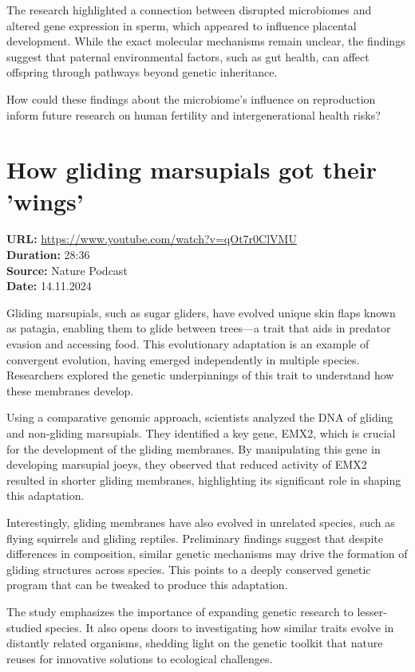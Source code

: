 \documentclass[12pt]{article}
\begin{document}
The research highlighted a connection between disrupted microbiomes and altered gene expression in sperm, which appeared to influence placental development. While the exact molecular mechanisms remain unclear, the findings suggest that paternal environmental factors, such as gut health, can affect offspring through pathways beyond genetic inheritance.  

\medskip
How could these findings about the microbiome’s influence on reproduction inform future research on human fertility and intergenerational health risks?





\newpage

\section{How gliding marsupials got their 'wings'}
\textbf{URL:} \url{https://www.youtube.com/watch?v=qOt7r0ClVMU}\\
\textbf{Duration:} 28:36\\
\textbf{Source:} Nature Podcast\\
\textbf{Date:} 14.11.2024


Gliding marsupials, such as sugar gliders, have evolved unique skin flaps known as patagia, enabling them to glide between trees—a trait that aids in predator evasion and accessing food. This evolutionary adaptation is an example of convergent evolution, having emerged independently in multiple species. Researchers explored the genetic underpinnings of this trait to understand how these membranes develop.  

Using a comparative genomic approach, scientists analyzed the DNA of gliding and non-gliding marsupials. They identified a key gene, EMX2, which is crucial for the development of the gliding membranes. By manipulating this gene in developing marsupial joeys, they observed that reduced activity of EMX2 resulted in shorter gliding membranes, highlighting its significant role in shaping this adaptation.  

Interestingly, gliding membranes have also evolved in unrelated species, such as flying squirrels and gliding reptiles. Preliminary findings suggest that despite differences in composition, similar genetic mechanisms may drive the formation of gliding structures across species. This points to a deeply conserved genetic program that can be tweaked to produce this adaptation.  

The study emphasizes the importance of expanding genetic research to lesser-studied species. It also opens doors to investigating how similar traits evolve in distantly related organisms, shedding light on the genetic toolkit that nature reuses for innovative solutions to ecological challenges.\\[5px]  
\end{document}
